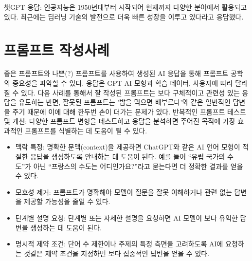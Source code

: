 \documentclass[
  letterpaper,
]{book}
\begin{document}
\begin{tcolorbox}[enhanced jigsaw, opacityback=0, opacitybacktitle=0.6, colback=white, rightrule=.15mm, coltitle=black, colframe=quarto-callout-note-color-frame, colbacktitle=quarto-callout-note-color!10!white, bottomrule=.15mm, bottomtitle=1mm, breakable, title=\textcolor{quarto-callout-note-color}{\faInfo}\hspace{0.5em}{프롬프트: 다음 텍스트는 인공지능의 역사와 발전에 대한 내용을 담고 있다.
정보 분석가로서 중요한 포인트만을 포함하여 2\textasciitilde3문장으로
간결하게 요약하라.}, titlerule=0mm, leftrule=.75mm, toptitle=1mm, left=2mm, arc=.35mm, toprule=.15mm]

챗GPT 응답: 인공지능은 1950년대부터 시작되어 현재까지 다양한 분야에서
활용되고 있다. 최근에는 딥러닝 기술의 발전으로 더욱 빠른 성장을 이루고
있다라고 응답했다.

\end{tcolorbox}

\hypertarget{uxd504uxb86cuxd504uxd2b8-uxc791uxc131uxc0acuxb840}{%
\section{프롬프트
작성사례}\label{uxd504uxb86cuxd504uxd2b8-uxc791uxc131uxc0acuxb840}}

좋은 프롬프트와 나쁜(?) 프롬프트를 사용하여 생성된 AI 응답을 통해
프롬프트 공학의 중요성을 파악할 수 있다. 응답은 GPT AI 모형과 학습
데이터, 사용자에 따라 달라질 수 있다. 다음 사례를 통해서 잘 작성된
프롬프트는 보다 구체적이고 관련성 있는 응답을 유도하는 반면, 잘못된
프롬프트는 '밥을 먹으면 배부르다'와 같은 일반적인 답변을 주기 때문에
이에 대해 한두번 손이 더가는 문제가 있다. 반복적인 프롬프트 테스트 및
개선: 다양한 프롬프트 변형을 테스트하고 응답을 분석하면 주어진 목적에
가장 효과적인 프롬프트를 식별하는 데 도움이 될 수 있다.

\begin{itemize}
\item
  맥락 특정: 명확한 문맥(context)을 제공하면 ChatGPT와 같은 AI 언어
  모형이 적절한 응답을 생성하도록 안내하는 데 도움이 된다. 예를 들어
  ``유럽 국가의 수도''가 아닌 ``프랑스의 수도는 어디인가요?''라고
  묻는다면 더 정확한 결과를 얻을 수 있다.
\item
  모호성 제거: 프롬프트가 명확해야 모델이 질문을 잘못 이해하거나 관련
  없는 답변을 제공할 가능성을 줄일 수 있다.
\item
  단계별 설명 요청: 단계별 또는 자세한 설명을 요청하면 AI 모델이 보다
  유익한 답변을 생성하는 데 도움이 된다.
\item
  명시적 제약 조건: 단어 수 제한이나 주제의 특정 측면을 고려하도록 AI에
  요청하는 것같은 제약 조건을 지정하면 보다 집중적인 답변을 얻을 수
  있다.
\end{itemize}
\end{document}
